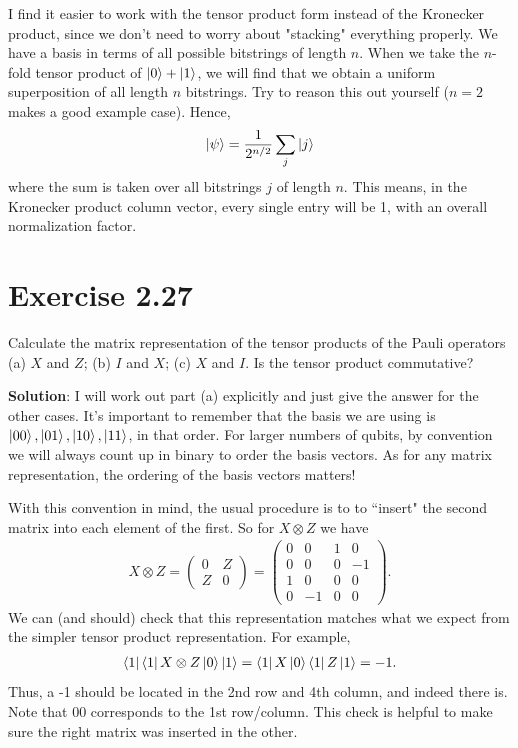 \documentclass{book}
\begin{document}
    I find it easier to work with the tensor product form instead of the Kronecker product, since we don't need to worry about "stacking" everything properly. We have a basis in terms of all possible bitstrings of length $n$. When we take the $n$-fold tensor product of $\ket{0} + \ket{1}$, we will find that we obtain a uniform superposition of all length $n$ bitstrings. Try to reason this out yourself ($n = 2$ makes a good example case). Hence,
    \begin{align}
        \ket{\psi} = \frac{1}{2^{n/2}} \sum_j \ket{j}
    \end{align}
    where the sum is taken over all bitstrings $j$ of length $n$. This means, in the Kronecker product column vector, every single entry will be 1, with an overall normalization factor.

\section*{Exercise 2.27}
    Calculate the matrix representation of the tensor products of the Pauli operators (a) $X$ and $Z$; (b) $I$ and $X$; (c) $X$ and $I$. Is the tensor product commutative?
    
    \textbf{Solution}: I will work out part (a) explicitly and just give the answer for the other cases. It's important to remember that the basis we are using is $\ket{00}, \ket{01}, \ket{10}, \ket{11}$, in that order. For larger numbers of qubits, by convention we will always count up in binary to order the basis vectors. As for any matrix representation, the ordering of the basis vectors matters!
    
    With this convention in mind, the usual procedure is to to ``insert" the second matrix into each element of the first. So for $X\otimes Z$ we have
    \begin{align}
        X \otimes Z = \begin{pmatrix}
            0 & Z \\
            Z & 0
        \end{pmatrix} = \begin{pmatrix}
            0 & 0 & 1 & 0 \\
            0 & 0 & 0 & -1 \\
            1 & 0 & 0 & 0 \\
            0 & -1 & 0 & 0
        \end{pmatrix}.
    \end{align}
    We can (and should) check that this representation matches what we expect from the simpler tensor product representation. For example,
    \begin{align}
       \bra{1}\bra{1} X\otimes Z \ket{0}\ket{1} = \bra{1}X\ket{0} \bra{1}Z\ket{1} = -1.
    \end{align}
    Thus, a -1 should be located in the 2nd row and 4th column, and indeed there is. Note that $00$ corresponds to the 1st row/column. This check is helpful to make sure the right matrix was inserted in the other. 
    
\end{document}

